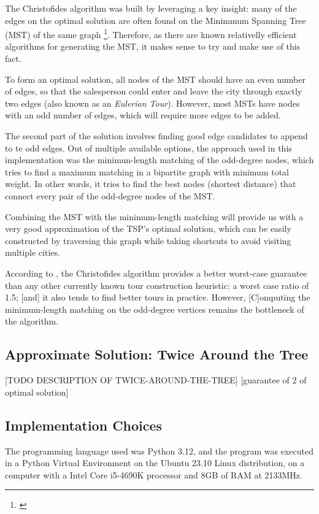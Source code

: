 \documentclass[12pt]{article}
\begin{document}
The Christofides algorithm was built by leveraging a key insight: many of the edges on the 
optimal solution are often found on the Minimmum Spanning Tree (MST) of the same graph 
\footnote{\cite{reducible_explanation}}. Therefore, as there are known relativelly efficient 
algorithms for generating the MST, it makes sense to try and make use of this fact.

To form an optimal solution, all nodes of the MST should have an even number of edges, so 
that the salesperson could enter and leave the city through exactly two edges (also known as an 
\textit{Eulerian Tour}). However, most MSTs have nodes with an odd number of edges, 
which will require more edges to be added.

The second part of the solution involves finding good edge candidates to append to te odd 
edges. Out of multiple available options, the approach used in this implementation was the minimun-length
matching of the odd-degree nodes, which tries to find a maximum matching in a bipartite 
graph with minimum total weight. In other words, it tries to find the best nodes (shortest distance) 
that connect every pair of the odd-degree nodes of the MST.

Combining the MST with the minimum-length matching will provide us with a very good 
approximation of the TSP's optimal solution, which can be easily constructed by
traversing this graph while taking shortcuts to avoid visiting multiple cities.

According to \cite{Johnson2003}, the Christofides algorithm provides a better 
worst-case guarantee than any other currently known tour construction heuristic: a worst case ratio of 1.5; 
[and] it also tends to find better tours in practice. However, [C]omputing the minimum-length 
matching on the odd-degree vertices remains the bottleneck of the algorithm.

\subsection{Approximate Solution: Twice Around the Tree}

[TODO DESCRIPTION OF TWICE-AROUND-THE-TREE]
[guarantee of 2 of optimal solution]

\subsection{Implementation Choices}

The programming language used was Python 3.12, and the program was executed 
in a Python Virtual Environment on the Ubuntu 23.10 Linux distribution, on a computer with a 
Intel Core i5-4690K processor and 8GB of RAM at 2133MHz.
\end{document}
